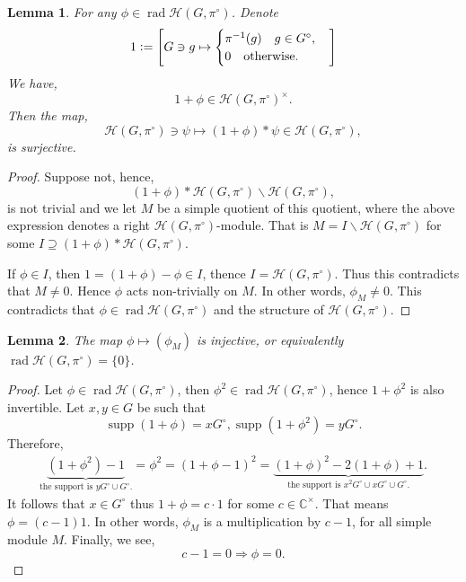 \documentclass[8pt]{article}
\newtheorem{lemma}{Lemma}[section]
\DeclareMathOperator{\rad}{rad}
\DeclareMathOperator{\supp}{supp}
\newcommand{\defeq}{\vcentcolon=}
\newcommand{\C}[0]{\mathbb{C}}
\newcommand{\hecke}[0]{\mathscr{H}}
\begin{document}
\begin{lemma}
  For any $\phi\in\rad\hecke(G,\pi^\circ)$. Denote 
  \begin{equation*}
    1\defeq\left[G\ni g\mapsto\begin{cases}
      \pi^{-1}(g)\quad g\in G^\circ,\\
      0\quad \text{otherwise}.
    \end{cases}
    \right]
  \end{equation*}
  We have,
  \begin{equation*}
    1+\phi\in\hecke(G,\pi^\circ)^\times.
  \end{equation*}
  Then the map,
  \begin{equation*}
    \hecke(G,\pi^\circ)\ni\psi\mapsto(1+\phi)\ast\psi\in\hecke(G,\pi^\circ),
  \end{equation*}
  is surjective.
  \label{lemma_74_claim_1}
\end{lemma}
\begin{proof}
  Suppose not, hence,
  \begin{equation*}
    (1+\phi)\ast\hecke(G,\pi^\circ)\backslash\hecke(G,\pi^\circ),
  \end{equation*}
  is not trivial and we let $M$ be a simple quotient of this quotient, where the above expression denotes a right $\hecke(G,\pi^\circ)$-module.
  That is $M = I\backslash\hecke(G,\pi^\circ)$ for some $I\supseteq (1+\phi)\ast\hecke(G,\pi^\circ)$.
  \par If $\phi\in I$, then $1=(1+\phi)-\phi\in I$, thence $I = \hecke(G,\pi^\circ)$. Thus this contradicts that $M\not=0$. Hence $\phi$ acts non-trivially on $M$. In other words, $\phi_M\not=0$. This contradicts
  that $\phi\in\rad\hecke(G,\pi^\circ)$ and the structure of $\hecke(G,\pi^\circ)$.
\end{proof}


\begin{lemma}
  \label{lemma_74}
  The map $\phi\mapsto(\phi_M)$ is injective, or equivalently $\rad\hecke(G,\pi^\circ)=\{0\}$. 
\end{lemma}
\begin{proof}
  Let $\phi\in\rad\hecke(G,\pi^\circ)$, then $\phi^2\in\rad\hecke(G,\pi^\circ)$, hence $1+\phi^2$ is also invertible. Let $x,y\in G$ be such that 
  \begin{equation*}
    \supp(1+\phi)=xG^\circ,\supp(1+\phi^2)=yG^\circ.
  \end{equation*}
  Therefore,
  \begin{align*}
    \underbrace{(1+\phi^2)-1}_{\text{the support is $yG^\circ\cup G^\circ$.}} = \phi^2 = (1+\phi-1)^2 = \underbrace{(1+\phi)^2-2(1+\phi)+1}_{\text{the support is $x^2G^\circ\cup xG^\circ\cup G^\circ$.}}.
  \end{align*}
  It follows that $x\in G^\circ$ thus $1+\phi = c\cdot 1$ for some $c\in\C^\times$. That means $\phi = (c-1)1$. In other words, $\phi_M$ is a multiplication by $c-1$, for all simple module $M$. 
  Finally, we see,
  \begin{equation*}
    c-1=0\Rightarrow \phi=0.
  \end{equation*}
\end{proof}
\end{document}
